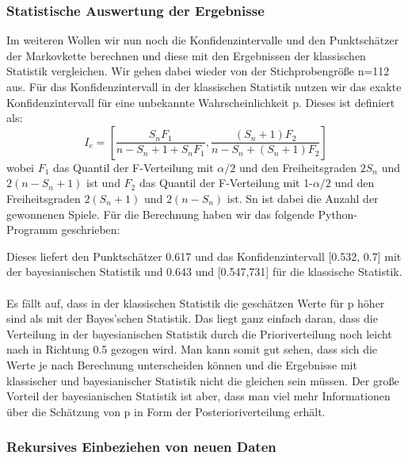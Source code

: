 \documentclass[a4paper,12pt]{article}
\begin{document}
\newpage
\subsubsection{Statistische Auswertung der Ergebnisse}

Im weiteren Wollen wir nun noch die Konfidenzintervalle und den Punktschätzer der Markovkette berechnen und diese mit den Ergebnissen der klassischen Statistik vergleichen. Wir gehen dabei wieder von der Stichprobengröße n=112 aus. Für das Konfidenzintervall in der klassischen Statistik nutzen wir das exakte Konfidenzintervall für eine unbekannte Wahrscheinlichkeit p. Dieses ist definiert als:
\begin{equation}
  I_e = \left[\frac{S_nF_1}{n-S_n+1+S_nF_1} , \frac{(S_n+1)F_2}{n-S_n+(S_n+1)F_2}\right]
\end{equation}
wobei $F_1$ das Quantil der F-Verteilung mit $\alpha/2$ und den Freiheitsgraden $2S_n$ und $2(n-S_n+1)$ ist und $F_2$ das Quantil der F-Verteilung mit 1-$\alpha/2$ und den Freiheitsgraden $2(S_n+1)$ und $2(n-S_n)$ ist. Sn ist dabei die Anzahl der gewonnenen Spiele. Für die Berechnung haben wir das folgende Python-Programm geschrieben:


\noindent Dieses liefert den Punktschätzer 0.617 und das Konfidenzintervall [0.532, 0.7] mit der bayesianischen Statistik und 0.643 und [0.547,731] für die klassische Statistik. \\\\
Es fällt auf, dass in der klassischen Statistik die geschätzen Werte für p höher sind als mit der Bayes'schen Statistik. Das liegt ganz einfach daran, dass die Verteilung in der bayesianischen Statistik durch die Prioriverteilung noch leicht nach in Richtung 0.5 gezogen wird. Man kann somit gut sehen, dass sich die Werte je nach Berechnung unterscheiden können und die Ergebnisse mit klassischer und bayesianischer Statistik nicht die gleichen sein müssen. Der große Vorteil der bayesianischen Statistik ist aber, dass man viel mehr Informationen über die Schätzung von p in Form der Posterioriverteilung erhält.

\newpage
\subsubsection{Rekursives Einbeziehen von neuen Daten}
\end{document}
